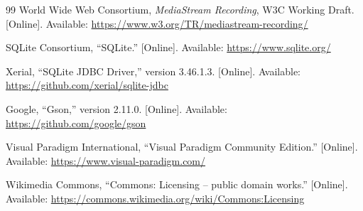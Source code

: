 \begin{thebibliography}{99}
 World Wide Web Consortium, \emph{MediaStream Recording}, W3C Working Draft. [Online].
Available: \url{https://www.w3.org/TR/mediastream-recording/}

 SQLite Consortium, ``SQLite.'' [Online]. Available: \url{https://www.sqlite.org/}

 Xerial, ``SQLite JDBC Driver,'' version 3.46.1.3. [Online]. Available:
\url{https://github.com/xerial/sqlite-jdbc}

 Google, ``Gson,'' version 2.11.0. [Online]. Available: \url{https://github.com/google/gson}

 Visual Paradigm International, ``Visual Paradigm Community Edition.'' [Online].
Available: \url{https://www.visual-paradigm.com/}

 Wikimedia Commons, ``Commons: Licensing -- public domain works.'' [Online]. Available:
\url{https://commons.wikimedia.org/wiki/Commons:Licensing}

\end{thebibliography}
